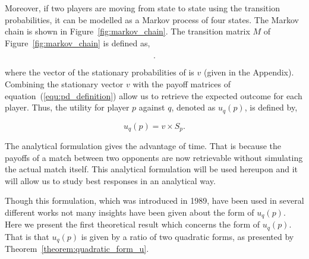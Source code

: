\documentclass[10pt]{article}
\begin{document}
Moreover, if two players are moving from state to state using the transition
probabilities, it can be modelled as a Markov process of four states. The Markov 
chain is shown in Figure~\ref{fig:markov_chain}. The transition matrix \(M\) of
Figure~\ref{fig:markov_chain} is defined as,

\begin{equation}\label{eq:m_matrix}
    .
\end{equation}

where the vector of the stationary probabilities of is \(v\) (given in the Appendix). %
Combining the stationary vector \(v\) with the payoff matrices of equation~(\ref{equ:pd_definition})
allow us to retrieve the expected outcome for each player. Thus, the utility for
player \(p\) against \(q\), denoted as \(u_q(p)\), is defined by,

\begin{equation}\label{eq:press_dyson_utility}
    u_q(p) = v \times S_p.
\end{equation}

The analytical formulation gives the advantage of time. That is because the 
payoffs of a match between two opponents are now retrievable without 
simulating the actual match itself. This analytical formulation will be used
hereupon and it will allow us to study best responses in an analytical way.

Though this formulation, which was introduced in 1989, have been
used in several different works not many insights have been given about the form of \(u_q(p)\).
Here we present the first theoretical result which concerns the form of \(u_q(p)\).
That is that \(u_q(p)\) is given by a ratio of two quadratic forms, as presented
by Theorem~\ref{theorem:quadratic_form_u}.
\end{document}
